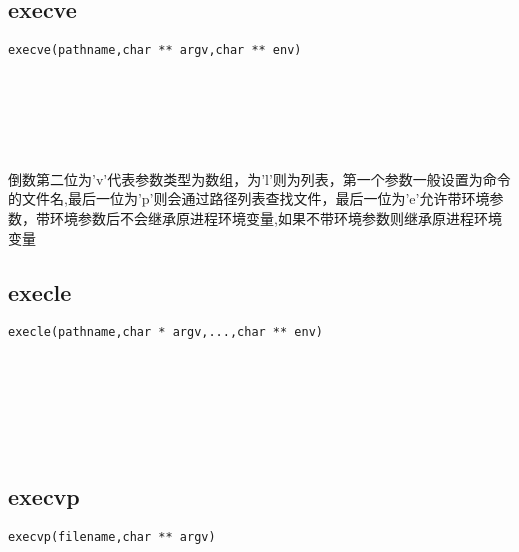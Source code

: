 \documentclass[10pt,a4paper]{article}
\begin{document}
\subsection{execve}
\begin{spacing}{2.0}
\lstset{language=C,numbers=none}
\begin{lstlisting}
execve(pathname,char ** argv,char ** env)
\end{lstlisting}
{\large\color[rgb]{0.2,0.4,0.6}{pathname:}} \\
{\large\color[rgb]{0.2,0.4,0.6}{argv:}} \\
{\large\color[rgb]{0.2,0.4,0.6}{env:}}
\paragraph{ \ \ }倒数第二位为'v'代表参数类型为数组，为'l'则为列表，第一个参数一般设置为命令的文件名,最后一位为'p'则会通过路径列表查找文件，最后一位为'e'允许带环境参数，带环境参数后不会继承原进程环境变量,如果不带环境参数则继承原进程环境变量
\end{spacing}

\subsection{execle}
\begin{spacing}{2.0}
\lstset{language=C,numbers=none}
\begin{lstlisting}
execle(pathname,char * argv,...,char ** env)
\end{lstlisting}
{\large\color[rgb]{0.2,0.4,0.6}{pathname:}} \\
{\large\color[rgb]{0.2,0.4,0.6}{argv:}} \\
{\large\color[rgb]{0.2,0.4,0.6}{...:}} \\
{\large\color[rgb]{0.2,0.4,0.6}{env:}}
\paragraph{ \ \ }
\end{spacing}

\subsection{execvp}
\begin{spacing}{2.0}
\lstset{language=C,numbers=none}
\begin{lstlisting}
execvp(filename,char ** argv)
\end{lstlisting}
{\large\color[rgb]{0.2,0.4,0.6}{filename:}} \\
{\large\color[rgb]{0.2,0.4,0.6}{argv:}}
\paragraph{ \ \ }
\end{spacing}
\end{document}
